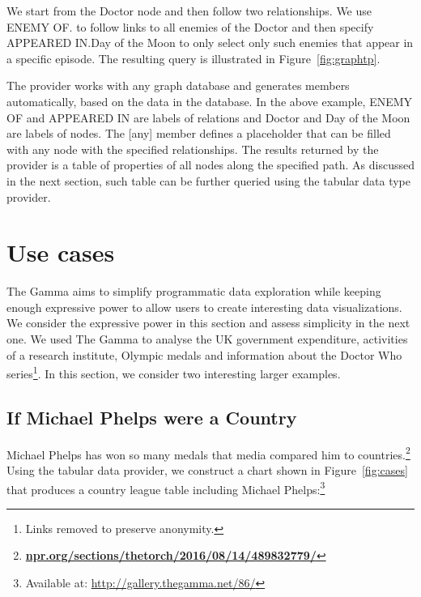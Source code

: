 \documentclass{sigchi}
\newcommand{\ikvd}[1]{{\fontfamily{zi4}\selectfont\small #1}}
\begin{document}
We start from the \ikvd{Doctor} node and then follow two relationships. We use
\ikvd{\textquotesingle ENEMY OF\textquotesingle.\textquotesingle [any]\textquotesingle}
to follow links to all enemies of the Doctor and then specify
\ikvd{\textquotesingle APPEARED IN\textquotesingle.\textquotesingle Day of the Moon\textquotesingle}
to only select only such enemies that appear in a specific episode. The resulting query
is illustrated in Figure~\ref{fig:graphtp}.

The provider works with any graph database and generates members automatically, based on the
data in the database. In the above example, \ikvd{ENEMY OF} and \ikvd{APPEARED IN} are labels
of relations and \ikvd{Doctor} and \ikvd{Day of the Moon} are labels of nodes. The
\ikvd{[any]} member defines a placeholder that can be filled with any node with the specified
relationships. The results returned by the provider is a table of properties of all nodes
along the specified path. As discussed in the next section, such table can be further queried
using the tabular data type provider.



\section{Use cases}
\label{sec:cases}

The Gamma aims to simplify programmatic data exploration while keeping enough expressive power
to allow users to create interesting data visualizations. We consider the expressive power in
this section and assess simplicity in the next one. We used The Gamma to analyse
the UK government expenditure, activities of a research institute, Olympic medals and
information about the Doctor Who series\footnote{Links removed to preserve anonymity.}.
In this section, we consider two interesting larger examples.

\subsection{If Michael Phelps were a Country}
Michael Phelps has won so many medals that media compared him to
countries.\footnote{\href{https://www.npr.org/sections/thetorch/2016/08/14/489832779/}{\small\bf\ttfamily npr.org/sections/thetorch/2016/08/14/489832779/}}
Using the tabular data provider, we construct a chart shown in Figure~\ref{fig:cases} that
produces a country league table including Michael Phelps:\footnote{Available at: \url{http://gallery.thegamma.net/86/}}
\end{document}
